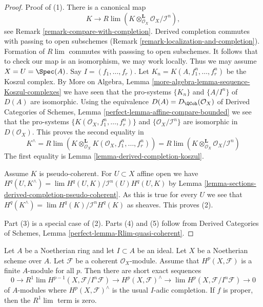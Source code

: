 \begin{proof}
Proof of (1). There is a canonical map
$$
K \longrightarrow
R\lim (K \otimes_{\mathcal{O}_X}^\mathbf{L} \mathcal{O}_X/\mathcal{I}^n),
$$
see Remark \ref{remark-compare-with-completion}.
Derived completion commutes with passing to open subschemes
(Remark \ref{remark-localization-and-completion}).
Formation of $R\lim$ commutes with passsing to open subschemes.
It follows that to check our map is an isomorphism, we may work locally.
Thus we may assume $X = U = \Spec(A)$.
Say $I = (f_1, \ldots, f_r)$. Let
$K_n = K(A, f_1^n, \ldots, f_r^n)$ be the Koszul complex.
By More on Algebra, Lemma \ref{more-algebra-lemma-sequence-Koszul-complexes}
we have seen that the pro-systems $\{K_n\}$ and
$\{A/I^n\}$ of $D(A)$ are isomorphic.
Using the equivalence $D(A) = D_{\QCoh}(\mathcal{O}_X)$
of Derived Categories of Schemes, Lemma
\ref{perfect-lemma-affine-compare-bounded}
we see that the pro-systems $\{K(\mathcal{O}_X, f_1^n, \ldots, f_r^n)\}$
and $\{\mathcal{O}_X/\mathcal{I}^n\}$ are isomorphic in
$D(\mathcal{O}_X)$. This proves the second equality in
$$
K^\wedge = R\lim \left(
K \otimes_{\mathcal{O}_X}^\mathbf{L} K(\mathcal{O}_X, f_1^n, \ldots, f_r^n)
\right) =
R\lim (K \otimes_{\mathcal{O}_X}^\mathbf{L} \mathcal{O}_X/\mathcal{I}^n)
$$
The first equality is
Lemma \ref{lemma-derived-completion-koszul}.

\medskip\noindent
Assume $K$ is pseudo-coherent. For $U \subset X$ affine open
we have $H^q(U, K^\wedge) = \lim H^q(U, K)/\mathcal{I}^n(U)H^q(U, K)$
by Lemma \ref{lemma-sections-derived-completion-pseudo-coherent}.
As this is true for every $U$ we see that
$H^q(K^\wedge) = \lim H^q(K)/\mathcal{I}^nH^q(K)$ as sheaves.
This proves (2).

\medskip\noindent
Part (3) is a special case of (2).
Parts (4) and (5) follow from
Derived Categories of Schemes, Lemma
\ref{perfect-lemma-Rlim-quasi-coherent}.
\end{proof}

\begin{lemma}
\label{lemma-formal-functions}
Let $A$ be a Noetherian ring and let $I \subset A$ be an ideal. Let $X$ be a
Noetherian scheme over $A$. Let $\mathcal{F}$ be a coherent
$\mathcal{O}_X$-module. Assume that $H^p(X, \mathcal{F})$ is
a finite $A$-module for all $p$. Then there are short exact sequences
$$
0 \to R^1\lim H^{p - 1}(X, \mathcal{F}/I^n\mathcal{F}) \to
H^p(X, \mathcal{F})^\wedge \to \lim H^p(X, \mathcal{F}/I^n\mathcal{F}) \to 0
$$
of $A$-modules where $H^p(X, \mathcal{F})^\wedge$ is the usual $I$-adic
completion. If $f$ is proper, then the $R^1\lim$ term is zero.
\end{lemma}

